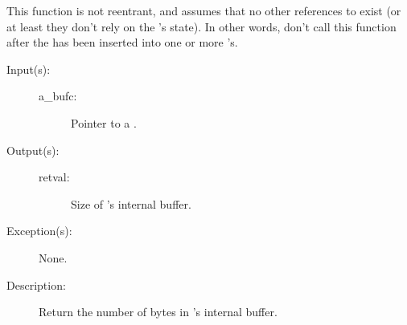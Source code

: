 \begin{description}
\begin{description}
		This function is not reentrant, and assumes that no other
		references to  exist (or at least they don't rely
		on the 's state).  In other words, don't call
		this function after the  has been inserted into
		one or more 's.
	\end{description}
\label{bufc_size_get}
\item[{\cfunc[cw\_uint32\_t]{bufc\_size\_get}{cw\_bufc\_t *a\_bufc}}: ]
	\begin{description}\item[]
	\item[Input(s): ]
		\begin{description}\item[]
		\item[a\_bufc: ]
			Pointer to a .
		\end{description}
	\item[Output(s): ]
		\begin{description}\item[]
		\item[retval: ]
			Size of 's internal buffer.
		\end{description}
	\item[Exception(s): ] None.
	\item[Description: ]
		Return the number of bytes in 's internal buffer.
	\end{description}
\end{description}
